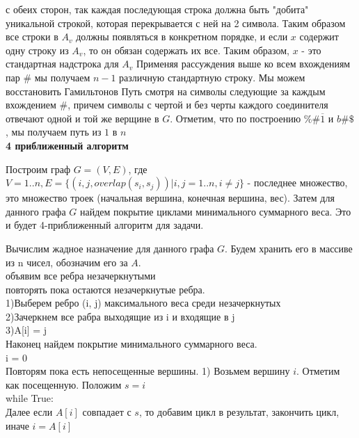 \documentclass[11pt,a4paper]{article}
\begin{document}
с обеих сторон, так каждая последующая строка должна быть "добита" уникальной строкой, которая перекрывается с ней на 2 символа. Таким образом все строки в $A_v$ должны появляться в
конкретном порядке, и если $x$ содержит одну строку из $A_v$, то он обязан содержать их все. Таким образом, $x$ - это стандартная надстрока для $A_v$
Применяя рассуждения выше ко всем вхождениям пар $\#$ мы получаем $n - 1$ различную стандартную строку. Мы можем восстановить Гамильтонов Путь смотря на символы следующие за каждым вхождением $\#$,
причем  символы с чертой и без черты каждого соединителя отвечают одной и той же верщине в $G$. Отметим, что по построению $\%\#\overline{1}$ и $b\#\$$, мы получаем путь из $1$ в $n$
\\
\textbf{4 приближенный алгоритм}
\par
Построим граф $G = (V, E)$, где $V = 1..n, E = \{(i, j, overlap(s_i, s_j))| i, j = 1..n, i \ne j\}$ - последнее множество,
это множество троек (начальная вершина, конечная вершина, вес). Затем для данного графа $G$ найдем покрытие циклами минимального суммарного веса.
Это и будет 4-приближенный алгоритм для задачи.
\par
Вычислим жадное назначение для данного графа $G$. Будем хранить его в массиве из n чисел, обозначим его за $A$.
\\
объявим все ребра незачеркнутыми\\
повторять пока остаются незачеркнутые ребра.\\
1)Выберем ребро (i, j) максимального веса среди незачеркнутых\\
2)Зачеркнем все рабра выходящие из i и входящие в j\\
3)A[i] = j\\

 Наконец найдем покрытие минимального суммарного веса.\\
 i = 0\\
 Повторям пока есть непосещенные вершины.
 1) Возьмем вершину $i$. Отметим как посещенную. Положим $s = i$\\
while True:\\
Далее если $A[i]$ совпадает с $s$, то добавим цикл в результат, закончить цикл,\\
иначе $i = A[i]$
\end{document}
